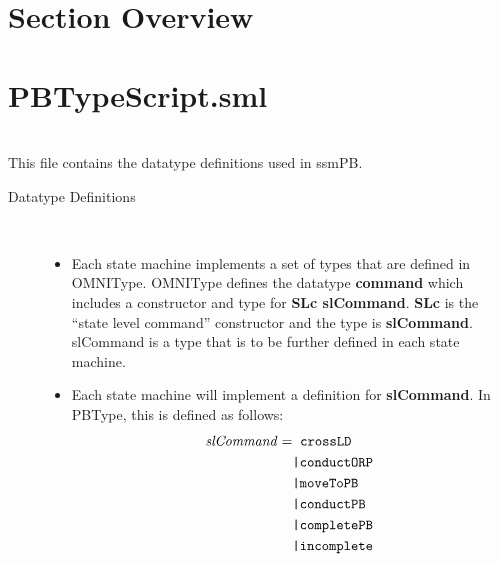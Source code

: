 


%
\section*{Section Overview}
\label{sec:section-overview}


\section{PBTypeScript.sml}
\label{sec:pbtypescript.sml-1}

\ \\This file contains the datatype definitions used in ssmPB.\ \\
\begin{description}
\item[Datatype Definitions]\ 
  \begin{itemize}
    \item Each state machine implements a set of types that are defined in OMNIType.
    OMNIType defines the datatype \textbf{command} which includes a constructor
    and type for \textbf{SLc slCommand}.
    \textbf{SLc} is the “state level command” constructor and the type is \textbf{slCommand}.
    slCommand is a type that is to be further defined in each state machine.\ \\
    \item Each state machine will implement a definition for \textbf{slCommand}.
    In PBType, this is defined as follows:
    \begin{align*}
      \HOLFreeVar{slCommand} =&\;\; \HOLConst{crossLD}\ \\
      &\HOLTokenBar{} \HOLConst{conductORP}\ \\
      &\HOLTokenBar{} \HOLConst{moveToPB}\ \\
      &\HOLTokenBar{} \HOLConst{conductPB}\ \\
      &\HOLTokenBar{} \HOLConst{completePB}\ \\
      &\HOLTokenBar{} \HOLConst{incomplete}

\end{align*}
\end{itemize}
\end{description}
